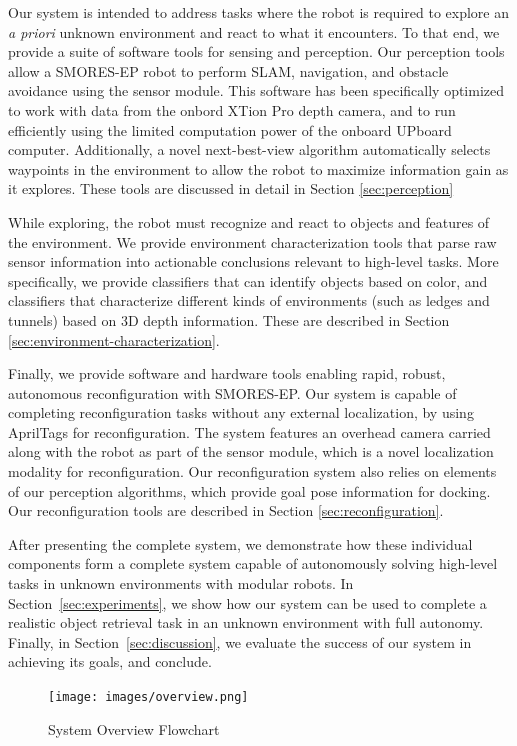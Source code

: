 \documentclass[conference]{IEEEtran}
\begin{document}
Our system is intended to address tasks where the robot is required to explore an \emph{a priori} unknown environment and react to what it encounters.  To that end, we provide a suite of software tools for sensing and perception. Our perception tools allow a SMORES-EP robot to perform SLAM, navigation, and obstacle avoidance using the sensor module.  This software has been specifically optimized to work with data from the onbord XTion Pro depth camera, and to run efficiently using the limited computation power of the onboard UPboard computer.  Additionally, a novel next-best-view algorithm automatically selects waypoints in the environment to allow the robot to maximize information gain as it explores.  These tools are discussed in detail in Section \ref{sec:perception}

While exploring, the robot must recognize and react to objects and features of the environment.  We provide environment characterization tools that parse raw sensor information into actionable conclusions relevant to high-level tasks.  More specifically, we provide classifiers that can identify objects based on color, and classifiers that characterize different kinds of environments (such as ledges and tunnels) based on 3D depth information.  These are described in Section \ref{sec:environment-characterization}.

Finally, we provide software and hardware tools enabling rapid, robust, autonomous reconfiguration with SMORES-EP. Our system is capable of completing reconfiguration tasks without any external localization, by using AprilTags for reconfiguration. The system features an overhead camera carried along with the robot as part of the sensor module, which is a novel localization modality for reconfiguration. Our reconfiguration system also relies on elements of our perception algorithms, which provide goal pose information for docking.  Our reconfiguration tools are described in Section \ref{sec:reconfiguration}.

After presenting the complete system, we demonstrate how these individual components form a complete system capable of autonomously solving high-level tasks in unknown environments with modular robots.  In Section~\ref{sec:experiments}, we show how our system can be used to complete a realistic object retrieval task in an unknown environment with full autonomy.  Finally, in Section~\ref{sec:discussion}, we evaluate the success of our system in achieving its goals, and conclude.
%
\begin{figure}
\begin{center}
\texttt{[image: images/overview.png]}
\caption{System Overview Flowchart}
\label{fig:overview}
\end{center}
\end{figure} 
%
\end{document}
